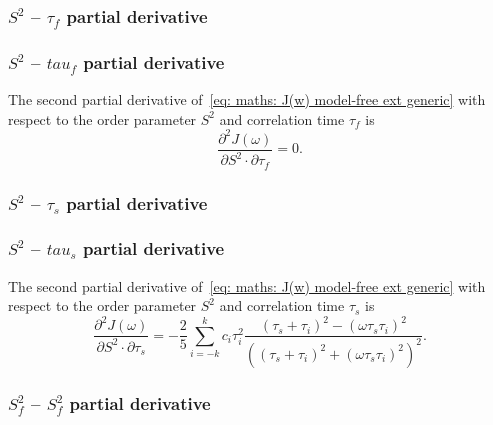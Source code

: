 \begin{latexonly}
    \subsubsection{$S^2$ -- $\tau_f$ partial derivative}
\end{latexonly}
\begin{htmlonly}
    \subsubsection{$S^2$ -- $tau_f$ partial derivative}
\end{htmlonly}

The second partial derivative of~\eqref{eq: maths: J(w) model-free ext generic} with respect to the order parameter $S^2$ and correlation time $\tau_f$ is
\begin{equation}
    \frac{\partial^2 J(\omega)}{\partial S^2 \cdot \partial \tau_f} = 0.
\end{equation}


\begin{latexonly}
    \subsubsection{$S^2$ -- $\tau_s$ partial derivative}
\end{latexonly}
\begin{htmlonly}
    \subsubsection{$S^2$ -- $tau_s$ partial derivative}
\end{htmlonly}

The second partial derivative of~\eqref{eq: maths: J(w) model-free ext generic} with respect to the order parameter $S^2$ and correlation time $\tau_s$ is
\begin{equation}
    \frac{\partial^2 J(\omega)}{\partial S^2 \cdot \partial \tau_s} = -\frac{2}{5} \sum_{i=-k}^k c_i \tau_i^2
        \frac{(\tau_s + \tau_i)^2 - (\omega \tau_s \tau_i)^2}{\left((\tau_s + \tau_i)^2 + (\omega \tau_s \tau_i)^2 \right)^2}.
\end{equation}



\subsubsection{$S^2_f$ -- $S^2_f$ partial derivative}


